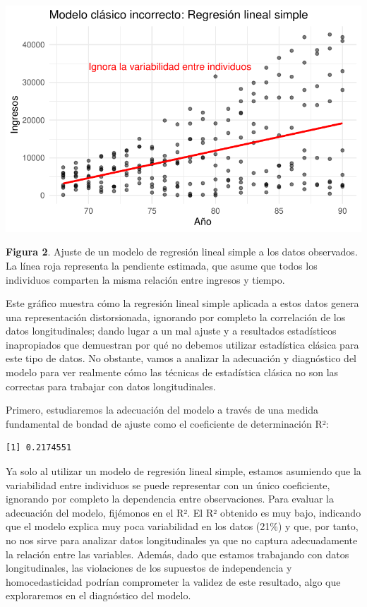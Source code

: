 \documentclass[
  letterpaper,
  DIV=11,
  numbers=noendperiod]{scrreprt}
\begin{document}
\includegraphics{cap2_files/figure-pdf/unnamed-chunk-3-1.pdf}

\textbf{Figura 2}. Ajuste de un modelo de regresión lineal simple a los
datos observados. La línea roja representa la pendiente estimada, que
asume que todos los individuos comparten la misma relación entre
ingresos y tiempo.

Este gráfico muestra cómo la regresión lineal simple aplicada a estos
datos genera una representación distorsionada, ignorando por completo la
correlación de los datos longitudinales; dando lugar a un mal ajuste y a
resultados estadísticos inapropiados que demuestran por qué no debemos
utilizar estadística clásica para este tipo de datos. No obstante, vamos
a analizar la adecuación y diagnóstico del modelo para ver realmente
cómo las técnicas de estadística clásica no son las correctas para
trabajar con datos longitudinales.

Primero, estudiaremos la adecuación del modelo a través de una medida
fundamental de bondad de ajuste como el coeficiente de determinación R²:

\begin{verbatim}
[1] 0.2174551
\end{verbatim}

Ya solo al utilizar un modelo de regresión lineal simple, estamos
asumiendo que la variabilidad entre individuos se puede representar con
un único coeficiente, ignorando por completo la dependencia entre
observaciones. Para evaluar la adecuación del modelo, fijémonos en el
R². El R² obtenido es muy bajo, indicando que el modelo explica muy poca
variabilidad en los datos (21\%) y que, por tanto, no nos sirve para
analizar datos longitudinales ya que no captura adecuadamente la
relación entre las variables. Además, dado que estamos trabajando con
datos longitudinales, las violaciones de los supuestos de independencia
y homocedasticidad podrían comprometer la validez de este resultado,
algo que exploraremos en el diagnóstico del modelo.
\end{document}
